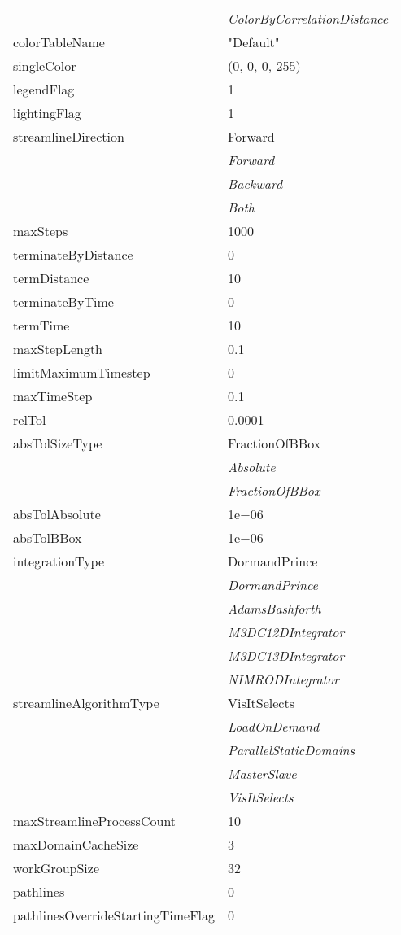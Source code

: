 \documentclass[10pt,a4paper]{report}
\begin{document}
\begin{longtable}{ll}
 & {\it  ColorByCorrelationDistance} \\
colorTableName  &  "Default" \\
singleColor  &  (0, 0, 0, 255) \\
legendFlag  &  1 \\
lightingFlag  &  1 \\
streamlineDirection  &  Forward   \\
 & {\it  Forward} \\
 & {\it  Backward} \\
 & {\it  Both} \\
maxSteps  &  1000 \\
terminateByDistance  &  0 \\
termDistance  &  10 \\
terminateByTime  &  0 \\
termTime  &  10 \\
maxStepLength  &  0.1 \\
limitMaximumTimestep  &  0 \\
maxTimeStep  &  0.1 \\
relTol  &  0.0001 \\
absTolSizeType  &  FractionOfBBox   \\
 & {\it  Absolute} \\
 & {\it  FractionOfBBox} \\
absTolAbsolute  &  1e$-$06 \\
absTolBBox  &  1e$-$06 \\
integrationType  &  DormandPrince   \\
 & {\it  DormandPrince} \\
 & {\it  AdamsBashforth} \\
 & {\it  M3DC12DIntegrator} \\
 & {\it  M3DC13DIntegrator} \\
 & {\it  NIMRODIntegrator} \\
streamlineAlgorithmType  &  VisItSelects   \\
 & {\it  LoadOnDemand} \\
 & {\it  ParallelStaticDomains} \\
 & {\it  MasterSlave} \\
 & {\it  VisItSelects} \\
maxStreamlineProcessCount  &  10 \\
maxDomainCacheSize  &  3 \\
workGroupSize  &  32 \\
pathlines  &  0 \\
pathlinesOverrideStartingTimeFlag  &  0 \\

\end{longtable}
\end{document}
